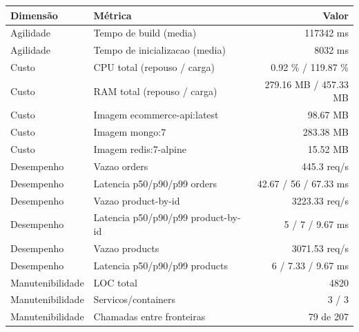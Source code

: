 \begin{quadro}[htb]
  \centering
  \caption{Métricas (ecommerce, capacidade-negocio, snapshot-0).}
  \label{qua:metricas-ecommerce-capacidade-negocio-snapshot-0}
  \renewcommand{\arraystretch}{1.15}
  \begin{tabular}{|l|l|r|}
    \hline
    \textbf{Dimensão} & \textbf{Métrica} & \textbf{Valor} \\
    \hline
    Agilidade & Tempo de build (media) & 117342 ms \\ \hline
    Agilidade & Tempo de inicializacao (media) & 8032 ms \\ \hline
    Custo & CPU total (repouso / carga) & 0.92 \% / 119.87 \% \\ \hline
    Custo & RAM total (repouso / carga) & 279.16 MB / 457.33 MB \\ \hline
    Custo & Imagem ecommerce-api:latest & 98.67 MB \\ \hline
    Custo & Imagem mongo:7 & 283.38 MB \\ \hline
    Custo & Imagem redis:7-alpine & 15.52 MB \\ \hline
    Desempenho & Vazao orders & 445.3 req/s \\ \hline
    Desempenho & Latencia p50/p90/p99 orders & 42.67 / 56 / 67.33 ms \\ \hline
    Desempenho & Vazao product-by-id & 3223.33 req/s \\ \hline
    Desempenho & Latencia p50/p90/p99 product-by-id & 5 / 7 / 9.67 ms \\ \hline
    Desempenho & Vazao products & 3071.53 req/s \\ \hline
    Desempenho & Latencia p50/p90/p99 products & 6 / 7.33 / 9.67 ms \\ \hline
    Manutenibilidade & LOC total & 4820 \\ \hline
    Manutenibilidade & Servicos/containers & 3 / 3 \\ \hline
    Manutenibilidade & Chamadas entre fronteiras & 79 de 207 \\ \hline
  \end{tabular}
\end{quadro}
